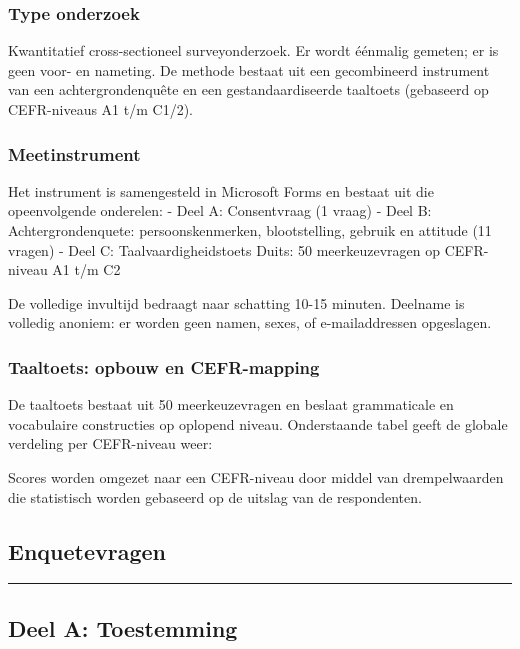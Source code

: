 \documentclass[
]{article}
\begin{document}
\subsubsection{Type onderzoek}\label{type-onderzoek}

Kwantitatief cross-sectioneel surveyonderzoek. Er wordt éénmalig
gemeten; er is geen voor- en nameting. De methode bestaat uit een
gecombineerd instrument van een achtergrondenquête en een
gestandaardiseerde taaltoets (gebaseerd op CEFR-niveaus A1 t/m C1/2).

\subsubsection{Meetinstrument}\label{meetinstrument}

Het instrument is samengesteld in Microsoft Forms en bestaat uit die
opeenvolgende onderelen: - Deel A: Consentvraag (1 vraag) - Deel B:
Achtergrondenquete: persoonskenmerken, blootstelling, gebruik en
attitude (11 vragen) - Deel C: Taalvaardigheidstoets Duits: 50
meerkeuzevragen op CEFR-niveau A1 t/m C2

De volledige invultijd bedraagt naar schatting 10-15 minuten. Deelname
is volledig anoniem: er worden geen namen, sexes, of e-mailaddressen
opgeslagen.

\subsubsection{Taaltoets: opbouw en
CEFR-mapping}\label{taaltoets-opbouw-en-cefr-mapping}

De taaltoets bestaat uit 50 meerkeuzevragen en beslaat grammaticale en
vocabulaire constructies op oplopend niveau. Onderstaande tabel geeft de
globale verdeling per CEFR-niveau weer:

Scores worden omgezet naar een CEFR-niveau door middel van
drempelwaarden die statistisch worden gebaseerd op de uitslag van de
respondenten.

\subsection{Enquetevragen}\label{enquetevragen}

\begin{center}\rule{0.5\linewidth}{0.5pt}\end{center}

\subsection{Deel A: Toestemming}\label{deel-a-toestemming}
\end{document}
